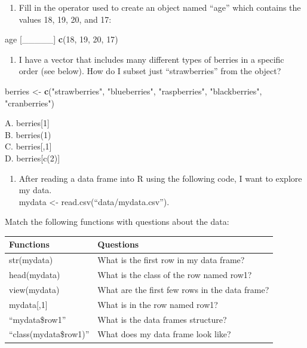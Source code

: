 \documentclass[
]{book}
\newenvironment{Shaded}{\begin{snugshade}}{\end{snugshade}}
\newcommand{\DecValTok}[1]{\textcolor[rgb]{0.00,0.00,0.81}{#1}}
\newcommand{\KeywordTok}[1]{\textcolor[rgb]{0.13,0.29,0.53}{\textbf{#1}}}
\newcommand{\NormalTok}[1]{#1}
\newcommand{\StringTok}[1]{\textcolor[rgb]{0.31,0.60,0.02}{#1}}
\providecommand{\tightlist}{%
  \setlength{\itemsep}{0pt}\setlength{\parskip}{0pt}}
\begin{document}
\begin{enumerate}
\def\labelenumi{\arabic{enumi}.}
\setcounter{enumi}{1}
\tightlist
\item
  Fill in the operator used to create an object named ``age'' which contains the values 18, 19, 20, and 17:
\end{enumerate}

\begin{Shaded}
\begin{Highlighting}[]
\NormalTok{age [\_\_\_\_\_] }\KeywordTok{c}\NormalTok{(}\DecValTok{18}\NormalTok{, }\DecValTok{19}\NormalTok{, }\DecValTok{20}\NormalTok{, }\DecValTok{17}\NormalTok{)}
\end{Highlighting}
\end{Shaded}

\begin{enumerate}
\def\labelenumi{\arabic{enumi}.}
\setcounter{enumi}{2}
\tightlist
\item
  I have a vector that includes many different types of berries in a specific order (see below). How do I subset just ``strawberries'' from the object?
\end{enumerate}

\begin{Shaded}
\begin{Highlighting}[]
\NormalTok{berries \textless{}{-}}\StringTok{ }\KeywordTok{c}\NormalTok{(}\StringTok{"strawberries"}\NormalTok{, }\StringTok{"blueberries"}\NormalTok{, }\StringTok{"raspberries"}\NormalTok{, }\StringTok{"blackberries"}\NormalTok{, }\StringTok{"cranberries"}\NormalTok{)}
\end{Highlighting}
\end{Shaded}

A. berries{[}1{]}\\
B. berries(1)\\
C. berries{[},1{]}\\
D. berries{[}c(2){]}

\begin{enumerate}
\def\labelenumi{\arabic{enumi}.}
\setcounter{enumi}{3}
\tightlist
\item
  After reading a data frame into R using the following code, I want to explore my data.\\
  mydata \textless- read.csv(``data/mydata.csv'').
\end{enumerate}

Match the following functions with questions about the data:

\begin{longtable}[]{@{}ll@{}}
\toprule
Functions & Questions\tabularnewline
\midrule
\endhead
str(mydata) & What is the first row in my data frame?\tabularnewline
head(mydata) & What is the class of the row named row1?\tabularnewline
view(mydata) & What are the first few rows in the data frame?\tabularnewline
mydata{[},1{]} & What is in the row named row1?\tabularnewline
``mydata\$row1'' & What is the data frames structure?\tabularnewline
``class(mydata\$row1)'' & What does my data frame look like?\tabularnewline
\bottomrule
\end{longtable}
\end{document}
